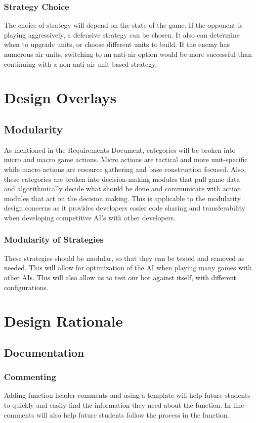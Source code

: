 \documentclass[10pt,letterpaper,onecolumn,draftclsnofoot]{IEEEtran}
\begin{document}
\subsubsection{Strategy Choice}
	The choice of strategy will depend on the state of the game. If the opponent is playing aggressively, a defensive strategy can be chosen. It also can determine when to upgrade units, or choose different units to build. If the enemy has numerous air units, switching to an anti-air option would be more successful than continuing with a non anti-air unit based strategy. 

\section{Design Overlays}
\subsection{Modularity}
	As mentioned in the Requirements Document, categories will be broken into micro and macro game actions. Micro actions are tactical and more unit-specific while macro actions are resource gathering and base construction focused. Also, these categories are broken into decision-making modules that pull game data and algorithmically decide what should be done and communicate with action modules that act on the decision making. This is applicable to the modularity design concerns as it provides developers easier code sharing and transferability when developing competitive AI's with other developers. 
\subsubsection{Modularity of Strategies}
	These strategies should be modular, so that they can be tested and removed as needed. This will allow for optimization of the AI when playing many games with other AIs. This will also allow us to test our bot against itself, with different configurations.
\section{Design Rationale}
\subsection{Documentation}
\subsubsection{Commenting}
	Adding function header comments and using a template will help future students to quickly and easily find the information they need about the function. In-line comments will also help future students follow the process in the function.
\end{document}
